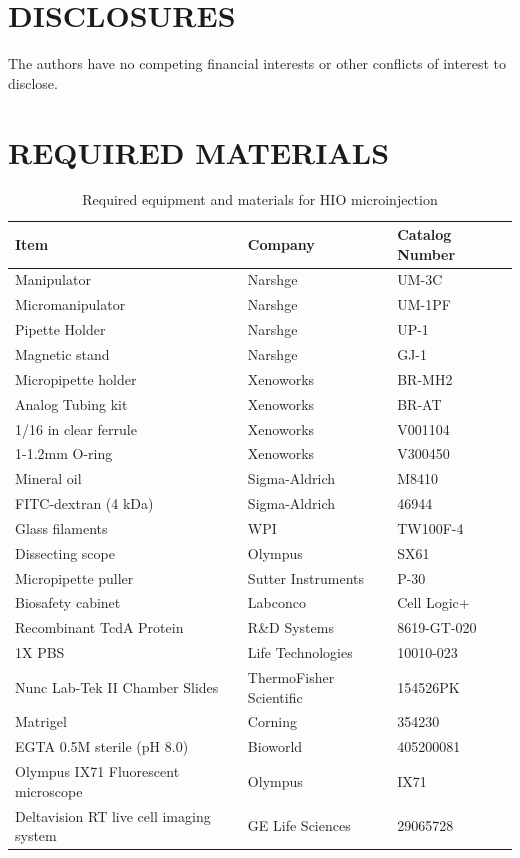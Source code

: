 \documentclass[11pt]{article}
\begin{document}
\section*{DISCLOSURES}
The authors have no competing financial interests or other conflicts of interest to disclose.\\

\printbibliography
\newpage
\section*{REQUIRED MATERIALS}
\begin{table}[ht]
\centering
\begin{tabular}{lll}
\textbf{Item} & \textbf{Company} & \textbf{Catalog Number}\\
\hline
Manipulator &   Narshge & UM-3C \\
Micromanipulator &      Narshge &       UM-1PF \\
Pipette Holder &        Narshge &       UP-1 \\
Magnetic stand &        Narshge  & GJ-1 \\
Micropipette holder &   Xenoworks &     BR-MH2 \\
Analog Tubing kit &     Xenoworks &     BR-AT \\
1/16 in clear ferrule & Xenoworks &     V001104 \\
1-1.2mm O-ring &        Xenoworks &     V300450 \\
Mineral oil &   Sigma-Aldrich & M8410 \\
FITC-dextran (4 kDa) &  Sigma-Aldrich & 46944 \\
Glass filaments  & WPI &        TW100F-4 \\
Dissecting scope &      Olympus &       SX61 \\
Micropipette puller &   Sutter Instruments &    P-30 \\
Biosafety cabinet &     Labconco &      Cell Logic+ \\
Recombinant TcdA Protein &      R\&D Systems &  8619-GT-020 \\
1X PBS & Life Technologies      & 10010-023 \\
Nunc Lab-Tek II Chamber Slides &        ThermoFisher Scientific  & 154526PK \\
Matrigel        & Corning &     354230 \\
EGTA 0.5M sterile (pH 8.0) &    Bioworld &      405200081 \\
Olympus IX71 Fluorescent microscope &   Olympus &       IX71 \\
Deltavision RT live cell imaging system & GE Life Sciences &    29065728 \\
\end{tabular}
\caption{Required equipment and materials for HIO microinjection}
\end{table}
\end{document}
